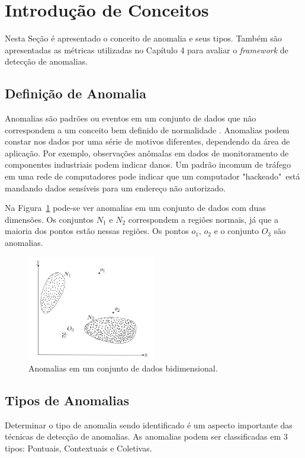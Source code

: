 \documentclass[cic,tc]{iiufrgs}
\begin{document}
\section{Introdução de Conceitos}
\label{conceitos}
Nesta Seção é apresentado o conceito de anomalia e seus tipos. Também são apresentadas as métricas utilizadas no Capítulo 4 para avaliar o \textit{framework} de detecção de anomalias.

\subsection{Definição de Anomalia}
\label{anom_def}
Anomalias são padrões ou eventos em um conjunto de dados que não correspondem a um conceito bem definido de normalidade \cite{AnomalyDetectionSurvey2009}. Anomalias podem constar nos dados por uma série de motivos diferentes, dependendo da área de aplicação. Por exemplo, observações anômalas em dados de monitoramento de componentes industriais podem indicar danos. Um padrão incomum de tráfego em uma rede de computadores pode indicar que um computador "hackeado"~está mandando dados sensíveis para um endereço não autorizado.

Na Figura~\ref{fig_anomalias} pode-se ver anomalias em um conjunto de dados com duas dimensões. Os conjuntos $N_1$ e $N_2$ correspondem a regiões normais, já que a maioria dos pontos estão nessas regiões. Os pontos $o_1$, $o_2$ e o conjunto $O_3$ são anomalias.


\begin{figure}
	\caption{Anomalias em um conjunto de dados bidimensional.}
	\bigskip
		\begin{center}
			\includegraphics[width=0.5\textwidth]{fig_anomalias.png}
		\end{center}
	\label{fig_anomalias}
\end{figure}

\subsection{Tipos de Anomalias}
\label{anom_types}
Determinar o tipo de anomalia sendo identificado é um aspecto importante das técnicas de detecção de anomalias. As anomalias podem ser classificadas em 3 tipos: Pontuais, Contextuais e Coletivas.
\end{document}
